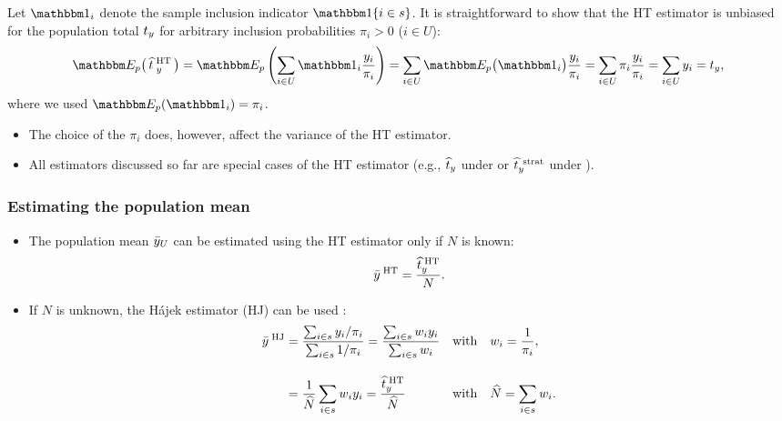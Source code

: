 \documentclass{my_eth_beamer}
\numberwithin{equation}{section}
\begin{document}
\begin{frame}
    \begin{Exkurs}
        Let $\indicator_i$ denote the sample inclusion indicator
        $\indicator\{i\in s\}$. It is straightforward to show that the HT
        estimator is \alert{unbiased} for the population total $t_y$ for
        \alert{arbitrary} inclusion probabilities $\pi_i>0$ ($i\in U$):
        \begin{equation*}
            \EE\big(\, \tysht_{\;y}\,\big) = \EE\left(\sum_{i \in U}
            \indicator_i \frac{y_i}{\pi_i}\right) = \sum_{i \in U}
            \EE\big(\indicator_i\big) \frac{y_i}{\pi_i} = \sum_{i \in U} \pi_i
            \frac{y_i}{\pi_i} = \sum_{i \in U} y_i = \ty,
        \end{equation*}
        \noindent where we used $\EE(\indicator_i)=\pi_i$.
    \end{Exkurs}
    \vspace{0.75em}
    \begin{itemize}
    \setlength{\itemsep}{6pt}
        \item The choice of the $\pi_i$ \alert{does}, however, affect the
            variance of the HT estimator.
        \item All estimators discussed so far are \alert{special cases} of the
            HT estimator (e.g., $\widehat{t}_y$ under \SRS or $\widehat{t}^{\;\, \mathrm{strat}}_y$ under
            \STSI).
    \end{itemize}
\end{frame}

\begin{frame}
    \frametitle{\normalsize Estimating the population mean}
    \begin{itemize}
    \setlength{\itemsep}{8pt}
        \item The population mean $\bar{y}_U$ can be estimated using the HT estimator
            only if $N$ is \alert{known}:
            \begin{equation*}
                \bar{y}^{\;\mathrm{HT}} = \frac{\widehat{t}^{\;\mathrm{HT}}_y}{N}.
            \end{equation*}
        \item If $N$ is \alert{unknown}, the \alert{H{\'a}jek estimator} (HJ)
            can be used \citep[][p. 236]{hajek_1971}:
            \begin{align*}
                \bar{y}^{\;\mathrm{HJ}} &= \frac{\sum_{i \in s} y_i / \pi_i}{\sum_{i \in
                    s} 1 / \pi_i} = \frac{\sum_{i \in s} w_i y_i}{\sum_{i \in
                    s} w_i} && \text{with} \quad w_i = \frac{1}{\pi_i},\\[1em]
                &= \frac{1}{\widehat{N}}\sum_{i \in s} w_i y_i =
                    \frac{\widehat{t}^{\;\mathrm{HT}}_y}{\widehat{N}} && \text{with} \quad
                    \widehat{N} = \sum_{i \in s} w_i.
            \end{align*}
    \end{itemize}
\end{frame}
\end{document}

